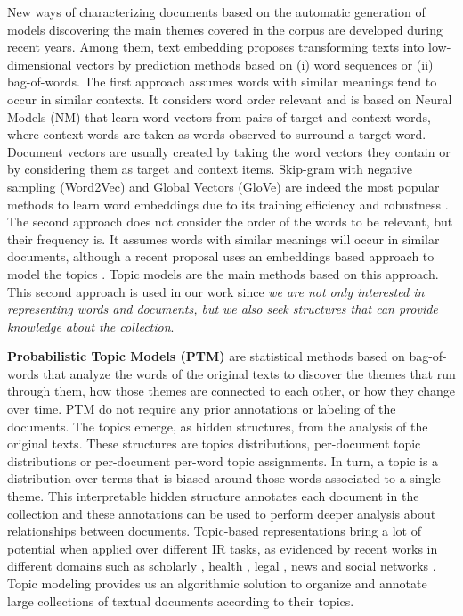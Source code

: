 New ways of characterizing documents based on the automatic generation of models discovering the main themes covered in the corpus are developed during recent years. Among them, text embedding proposes transforming texts into low-dimensional vectors by prediction methods based on (i) word sequences or (ii) bag-of-words. The first approach assumes words with similar meanings tend to occur in similar contexts. It considers word order relevant and is based on Neural Models (NM) that learn word vectors from pairs of target and context words, where context words are taken as words observed to surround a target word. Document vectors are usually created by taking the word vectors they contain or by considering them as target and context items. Skip-gram with negative sampling (Word2Vec) \citep{Mikolov2013c} and Global Vectors (GloVe) \citep{pennington2014} are indeed the most popular methods to learn word embeddings due to its training efficiency and robustness \citep{levy2015}. The second approach does not consider the order of the words to be relevant, but their frequency is. It assumes words with similar meanings will occur in similar documents, although a recent proposal uses an embeddings based approach to model the topics \citep{Dieng2020TopicMI}. Topic models \citep{Deerwester1990, Hofmann2001, Blei2003} are the main methods based on this approach. This second approach is used in our work since \textit{we are not only interested in representing words and documents, but we also seek structures that can provide knowledge about the collection}.

\textbf{Probabilistic Topic Models (PTM)} \citep{Hofmann2001,Blei2003} are statistical methods based on bag-of-words that analyze the words of the original texts to discover the themes that run through them, how those themes are connected to each other, or how they change over time. PTM do not require any prior annotations or labeling of the documents. The topics emerge, as hidden structures, from the analysis of the original texts. These structures are topics distributions, per-document topic distributions or per-document per-word topic assignments. In turn, a topic is a distribution over terms that is biased around those words associated to a single theme. This interpretable hidden structure annotates each document in the collection and these annotations can be used to perform deeper analysis about relationships between documents. Topic-based representations bring a lot of potential when applied over different IR tasks, as evidenced by recent works in different domains such as scholarly  \citep{Gatti2015}, health \citep{Lu2016, TapiNzali2017}, legal \citep{ONeill2017, Greene2016}, news \citep{He2017} and social networks \citep{Cheng2014a}. Topic modeling provides us an algorithmic solution to organize and annotate large collections of textual documents according to their topics.

